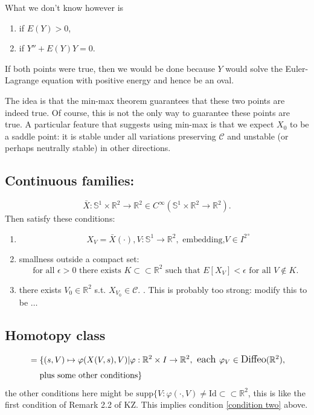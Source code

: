 \documentclass[12pt, a4paper]{amsart}
\theoremstyle{remark}
\newcommand{\R}{\mathbb{R}}
\newcommand{\So}{\mathbb{S}^1}
\begin{document}
What we don't know however is
\begin{enumerate}
\item if \(E(Y) > 0\),
\item if \(Y'' + E(Y) Y = 0\).
\end{enumerate}

If both points were true, then we would be done because \(Y\) would solve the Euler-Lagrange equation with positive energy and hence be an oval.

The idea is that the min-max theorem guarantees that these two points are indeed true. Of course, this is not the only way to guarantee these points are true. A particular feature that suggests using min-max is that we expect \(X_0\) to be a saddle point: it is stable under all variations preserving \(\mathcal{C}\) and unstable (or perhaps neutrally stable) in other directions.

\subsection*{Continuous families:}

$$\bar{X}: \So\times \R^2 \rightarrow \R^2\in C^\infty(\So\times \R^2\rightarrow\R^2).$$
Then satisfy these conditions:
\begin{enumerate}
\item $$\quad X_V=\bar{X}(\cdot),V:\So\to \R^2, \text{ embedding,} V\in {I^2}^\circ$$
\item  smallness outside a compact set:    \label{condition two}
$$\text{ for all } \epsilon>0 \text{ there exists }K\subset\subset \R^2 \text{ such that } E[X_V]<\epsilon \text{ for all } V\not\in K.$$
\item there exists $V_0\in\R^2$ s.t. $X_{V_0}\in \mathcal{C}.$  \label{condition three}.  This is probably too strong:   modify this to be $\dots$
\end{enumerate}


\subsection*{Homotopy class}

\begin{align*}[\bar{X}]&=\lbrace (s,V)\mapsto \varphi(X(V,s),V) \large{|} \varphi:\R^2\times I\to \R^2, \text{ each }\varphi_V\in \text{Diffeo}(\R^2), 
\\&\quad \text{ plus some other conditions} \rbrace \end{align*}
the other conditions here might be $\text{supp}\lbrace V: \varphi(\cdot, V)\not= \text{Id}\subset\subset \R^2$, this is like the first condition of Remark 2.2 of KZ.    This implies condition \ref{condition two} above.
\end{document}
